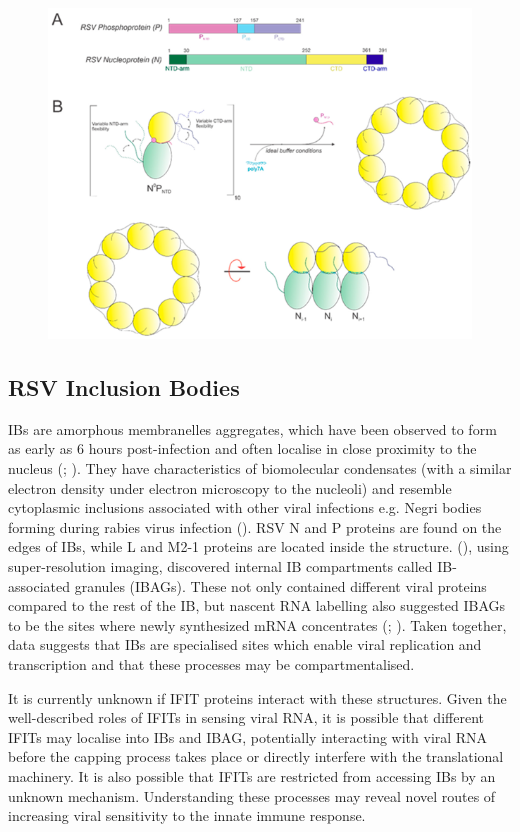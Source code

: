 \begin{figure}
    \centering
    \includegraphics[width=0.5\linewidth]{04. Introduction//Figs/10. n-p interaction.png}
    
    
\end{figure}




\subsection{RSV Inclusion Bodies} \label{subsec:RSV Inclusion Bodies}
IBs are amorphous membranelles aggregates, which have been observed to form as early as 6 hours post-infection and often localise in close proximity to the nucleus (\cite{Bachi1973MorphogenesisVirus}; \cite{Jobe2020RespiratorySignaling}). They have characteristics of biomolecular condensates (with a similar electron density under electron microscopy to the nucleoli) and resemble cytoplasmic inclusions associated with other viral infections e.g. Negri bodies forming during rabies virus infection (\cite{Nikolic2017NegriOrganelles}). RSV N and P proteins are found on the edges of IBs, while L and M2-1 proteins are located inside the structure. (\cite{Rincheval2017FunctionalVirus}), using super-resolution imaging, discovered internal IB compartments called IB-associated granules (IBAGs). These not only contained different viral proteins compared to the rest of the IB, but nascent RNA labelling also suggested IBAGs to be the sites where newly synthesized mRNA concentrates (\cite{Jobe2020RespiratorySignaling}; \cite{Richard2018RSVTranscription}). Taken together, data suggests that IBs are specialised sites which enable viral replication and transcription and that these processes may be compartmentalised.

It is currently unknown if IFIT proteins interact with these structures. Given the well-described roles of IFITs in sensing viral RNA, it is possible that different IFITs may localise into IBs and IBAG, potentially interacting with viral RNA before the capping process takes place or directly interfere with the translational machinery. It is also possible that IFITs are restricted from accessing IBs by an unknown mechanism. Understanding these processes may reveal novel routes of increasing viral sensitivity to the innate immune response.




